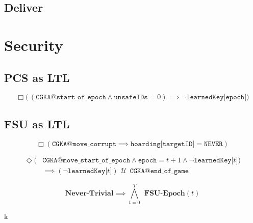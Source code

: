 \hypertarget{deliver}{%
\subsection{Deliver}\label{deliver}}

\hypertarget{sec:LTL-security}{%
\section{Security}\label{sec:LTL-security}}

\hypertarget{pcs-as-ltl}{%
\subsection{PCS as LTL}\label{pcs-as-ltl}}

\begin{LTL}[\,PCS\,]
    $$
    \Box \Big(\, ( \texttt{CGKA@start\_of\_epoch} \land \texttt{unsafeIDs} = 0 ) \implies \neg \texttt{learnedKey[epoch]} \Big)
    $$
\end{LTL}

\hypertarget{fsu-as-ltl}{%
\subsection{FSU as LTL}\label{fsu-as-ltl}}

\begin{LTL}
    $$
    \Box \left( \texttt{CGKA@move\_corrupt} \implies \texttt{hoarding[targetID]} = \texttt{NEVER} \right)
    $$
\end{LTL}

\begin{LTL}
    \begin{equation*}
    \begin{split}
    \Diamond ( & \texttt{CGKA@move\_start\_of\_epoch} \land \texttt{epoch} = t + 1 \land \neg \texttt{learnedKey[$t$]} ) \\
    & \implies ( \neg \texttt{learnedKey[$t$]} ) \,\;{\mathcal {U}}\;\, \texttt{CGKA@end\_of\_game}
    \end{split}
    \end{equation*}
\end{LTL}

\begin{LTL}[\;FSU\;]
    $$
    \textbf{Never-Trivial} \implies \bigwedge\limits_{t=0}^{T} \;\,\textbf{FSU-Epoch}(t)
    $$
\end{LTL}
k
